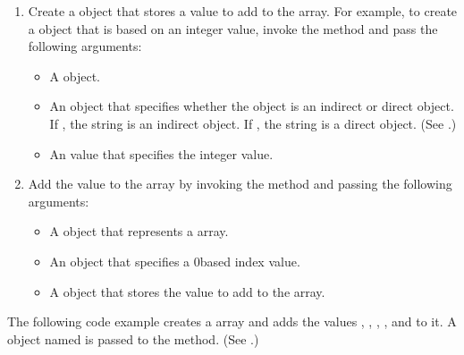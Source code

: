 \documentclass[letterpaper,12pt,english,openany,oneside]{sphinxmanual}
\begin{document}
\begin{enumerate}
%
\setcounter{enumi}{3}
\item {} 
Create a  object that stores a value to add to the  array. For example, to create a  object that is based on an integer value, invoke the  method and pass the following arguments:
\begin{itemize}
\item {} 
A  object.

\item {} 
An  object that specifies whether the  object is an indirect or direct object. If , the string is an indirect object. If , the string is a direct object. (See .)

\item {} 
An  value that specifies the integer value.

\end{itemize}

\item {} 
Add the value to the  array by invoking the  method and passing the following arguments:
\begin{itemize}
\item {} 
A  object that represents a  array.

\item {} 
An  object that specifies a 0\sphinxhyphen{}based index value.

\item {} 
A  object that stores the value to add to the array.

\end{itemize}

\end{enumerate}

The following code example creates a  array and adds the values , , , , and  to it. A  object named  is passed to the  method. (See .)
\end{document}
